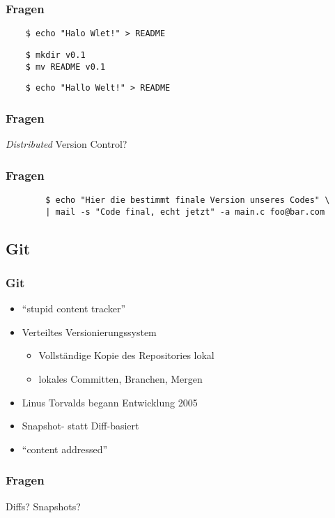 \documentclass[]{beamer}
\begin{document}
\begin{frame}[fragile]
	\frametitle{Fragen}
	\begin{verbatim}
	$ echo "Halo Wlet!" > README
	\end{verbatim}

	\begin{verbatim}
	$ mkdir v0.1
	$ mv README v0.1
	\end{verbatim}

	\begin{verbatim}
	$ echo "Hallo Welt!" > README
	\end{verbatim}
\end{frame}

\begin{frame}
	\frametitle{Fragen}
	\Huge{\emph{Distributed} Version Control?}
\end{frame}

\begin{frame}[fragile]
	\frametitle{Fragen}
	\begin{verbatim}
		$ echo "Hier die bestimmt finale Version unseres Codes" \ 
		| mail -s "Code final, echt jetzt" -a main.c foo@bar.com
	\end{verbatim}
\end{frame}

\subsection{Git}
\begin{frame}
	\frametitle{Git}
	\begin{itemize}
		\item
			``stupid content tracker''
		\item
			Verteiltes Versionierungssystem
			\begin{itemize}
				\item
					Vollständige Kopie des Repositories lokal
				\item
					lokales Committen, Branchen, Mergen
			\end{itemize}
		\item
			Linus Torvalds begann Entwicklung 2005
		\item
			Snapshot- statt Diff-basiert
		\item
			``content addressed''
	\end{itemize}
\end{frame}

\begin{frame}
	\frametitle{Fragen}
	\Huge{Diffs? Snapshots?}
\end{frame}
\end{document}
